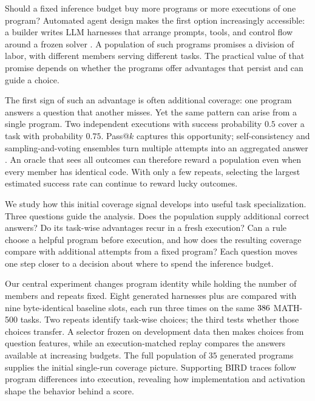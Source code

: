 Should a fixed inference budget buy more programs or more executions of
one program? Automated agent design makes the first option increasingly
accessible: a builder writes LLM harnesses that arrange prompts, tools,
and control flow around a frozen solver
\citep{adas2024,tthe2026,selfharness2026}. A population of such programs
promises a division of labor, with different members serving different
tasks. The practical value of that promise depends on whether the
programs offer advantages that persist and can guide a choice.

The first sign of such an advantage is often additional coverage:
one program answers a question that another misses. Yet the same pattern
can arise from a single program. Two independent executions with success
probability $0.5$ cover a task with probability $0.75$. Pass@$k$ captures
this opportunity; self-consistency and sampling-and-voting ensembles
turn multiple attempts into an aggregated answer
\citep{chen2021codex,selfconsistency2022,moreagents2024}. An oracle that
sees all outcomes can therefore reward a population even when every
member has identical code. With only a few repeats, selecting the
largest estimated success rate can continue to reward lucky outcomes.



We study how this initial coverage signal develops into useful task
specialization. Three questions guide the analysis. Does the population
supply additional correct answers? Do its task-wise advantages recur in
a fresh execution? Can a rule choose a helpful program before execution,
and how does the resulting coverage compare with additional attempts
from a fixed program? Each question moves one step closer to a decision
about where to spend the inference budget.

Our central experiment changes program identity while holding the
number of members and repeats fixed. Eight generated harnesses plus
\bare{} are compared with nine byte-identical baseline slots, each run
three times on the same $386$ MATH-500 tasks. Two repeats identify
task-wise choices; the third tests whether those choices transfer.
A selector frozen on development data then makes choices from question
features, while an execution-matched replay compares the answers
available at increasing budgets. The full population of $35$ generated
programs supplies the initial single-run coverage picture. Supporting
BIRD traces follow program differences into execution, revealing how
implementation and activation shape the behavior behind a score.

